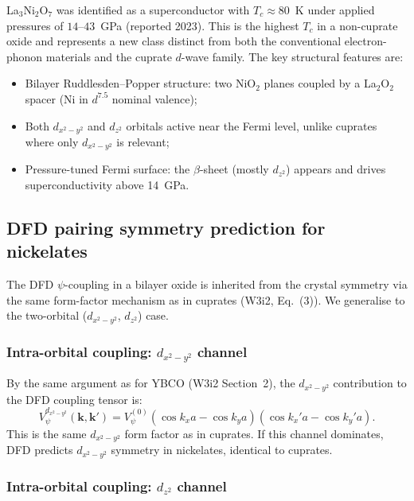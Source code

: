 \documentclass[11pt]{article}
\begin{document}
La$_3$Ni$_2$O$_7$ was identified as a superconductor with $T_c \approx 80$~K
under applied pressures of $14$--$43$~GPa (reported 2023). This is the highest
$T_c$ in a non-cuprate oxide and represents a new class distinct from both the
conventional electron-phonon materials and the cuprate $d$-wave family. The
key structural features are:
\begin{itemize}
  \item Bilayer Ruddlesden--Popper structure: two NiO$_2$ planes coupled by
        a La$_2$O$_2$ spacer (Ni in $d^{7.5}$ nominal valence);
  \item Both $d_{x^2-y^2}$ and $d_{z^2}$ orbitals active near the Fermi level,
        unlike cuprates where only $d_{x^2-y^2}$ is relevant;
  \item Pressure-tuned Fermi surface: the $\beta$-sheet (mostly $d_{z^2}$)
        appears and drives superconductivity above 14~GPa.
\end{itemize}

\subsection{DFD pairing symmetry prediction for nickelates}

The DFD $\psi$-coupling in a bilayer oxide is inherited from the crystal
symmetry via the same form-factor mechanism as in cuprates (W3i2, Eq.~(3)).
We generalise to the two-orbital ($d_{x^2-y^2}$, $d_{z^2}$) case.

\subsubsection{Intra-orbital coupling: $d_{x^2-y^2}$ channel}

By the same argument as for YBCO (W3i2 Section~2), the $d_{x^2-y^2}$
contribution to the DFD coupling tensor is:
\begin{equation}
V_\psi^{d_{x^2-y^2}}(\mathbf{k},\mathbf{k}')
= V_\psi^{(0)}(\cos k_x a - \cos k_y a)(\cos k_x' a - \cos k_y' a).
\label{eq:Vpsi-d-Ni}
\end{equation}
This is the same $d_{x^2-y^2}$ form factor as in cuprates. If this
channel dominates, DFD predicts $d_{x^2-y^2}$ symmetry in nickelates,
identical to cuprates.

\subsubsection{Intra-orbital coupling: $d_{z^2}$ channel}
\end{document}
